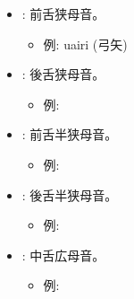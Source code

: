 \begin{itemize}
    \item \textbf{}: 前舌狭母音。
    \begin{itemize}
        \item 例: uairi \textipa{[uwaiRi]} (弓矢)
    \end{itemize}

    \item \textbf{}: 後舌狭母音。
    \begin{itemize}
        \item 例: %
    \end{itemize}

    \item \textbf{}: 前舌半狭母音。
    \begin{itemize}
        \item 例: %
    \end{itemize}

    \item \textbf{}: 後舌半狭母音。
    \begin{itemize}
        \item 
例: %
    \end{itemize}

    \item \textbf{}: 中舌広母音。
    \begin{itemize}
        \item 例: %
    \end{itemize}
\end{itemize}